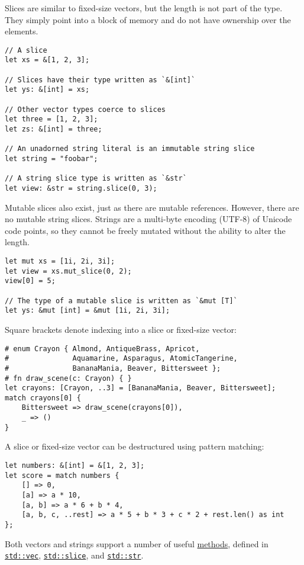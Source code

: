 \documentclass[]{article}
\begin{document}
Slices are similar to fixed-size vectors, but the length is not part of
the type. They simply point into a block of memory and do not have
ownership over the elements.

\begin{verbatim}
// A slice
let xs = &[1, 2, 3];

// Slices have their type written as `&[int]`
let ys: &[int] = xs;

// Other vector types coerce to slices
let three = [1, 2, 3];
let zs: &[int] = three;

// An unadorned string literal is an immutable string slice
let string = "foobar";

// A string slice type is written as `&str`
let view: &str = string.slice(0, 3);
\end{verbatim}

Mutable slices also exist, just as there are mutable references.
However, there are no mutable string slices. Strings are a multi-byte
encoding (UTF-8) of Unicode code points, so they cannot be freely
mutated without the ability to alter the length.

\begin{verbatim}
let mut xs = [1i, 2i, 3i];
let view = xs.mut_slice(0, 2);
view[0] = 5;

// The type of a mutable slice is written as `&mut [T]`
let ys: &mut [int] = &mut [1i, 2i, 3i];
\end{verbatim}

Square brackets denote indexing into a slice or fixed-size vector:

\begin{verbatim}
# enum Crayon { Almond, AntiqueBrass, Apricot,
#               Aquamarine, Asparagus, AtomicTangerine,
#               BananaMania, Beaver, Bittersweet };
# fn draw_scene(c: Crayon) { }
let crayons: [Crayon, ..3] = [BananaMania, Beaver, Bittersweet];
match crayons[0] {
    Bittersweet => draw_scene(crayons[0]),
    _ => ()
}
\end{verbatim}

A slice or fixed-size vector can be destructured using pattern matching:

\begin{verbatim}
let numbers: &[int] = &[1, 2, 3];
let score = match numbers {
    [] => 0,
    [a] => a * 10,
    [a, b] => a * 6 + b * 4,
    [a, b, c, ..rest] => a * 5 + b * 3 + c * 2 + rest.len() as int
};
\end{verbatim}

Both vectors and strings support a number of useful
\hyperref[methods]{methods}, defined in
\href{std/vec/index.html}{\texttt{std::vec}},
\href{std/slice/index.html}{\texttt{std::slice}}, and
\href{std/str/index.html}{\texttt{std::str}}.
\end{document}
